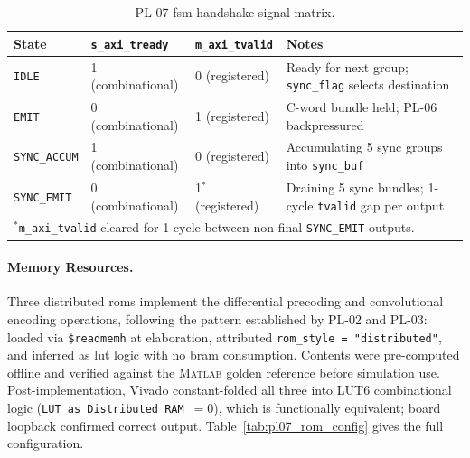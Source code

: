 \begin{table}[htbp]
  \caption{PL-07 \ac{fsm} handshake signal matrix.}
  \label{tab:pl07_fsm}
  \centering
  \begin{tabular}{lllp{7cm}}
    \hline
    State                 & \texttt{s\_axi\_tready}  & \texttt{m\_axi\_tvalid}  & Notes \\
    \hline
    \texttt{IDLE}         & 1 (combinational) & 0 (registered)
      & Ready for next group; \texttt{sync\_flag} selects destination \\[2pt]
    \texttt{EMIT}         & 0 (combinational) & 1 (registered)
      & C-word bundle held; PL-06 backpressured \\[2pt]
    \texttt{SYNC\_ACCUM}  & 1 (combinational) & 0 (registered)
      & Accumulating 5 sync groups into \texttt{sync\_buf} \\[2pt]
    \texttt{SYNC\_EMIT}   & 0 (combinational) & 1$^{*}$ (registered)
      & Draining 5 sync bundles; 1-cycle \texttt{tvalid} gap per output \\
    \hline
    \multicolumn{4}{l}{\small $^{*}$\texttt{m\_axi\_tvalid} cleared for 1 cycle between non-final \texttt{SYNC\_EMIT} outputs.} \\
  \end{tabular}
\end{table}


\FloatBarrier
\paragraph{Memory Resources.}

Three distributed \acp{rom} implement the differential precoding and
convolutional encoding operations, following the pattern established
by PL-02 and PL-03: loaded via \texttt{\$readmemh} at elaboration,
attributed \texttt{rom\_style~=~"distributed"}, and inferred as
\ac{lut} logic with no \ac{bram} consumption.
Contents were pre-computed offline and verified against the
\textsc{Matlab} golden reference before simulation use.
Post-implementation, Vivado constant-folded all three into LUT6
combinational logic (\texttt{LUT as Distributed RAM}~$= 0$),
which is functionally equivalent; board loopback confirmed correct
output.
Table~\ref{tab:pl07_rom_config} gives the full configuration.

